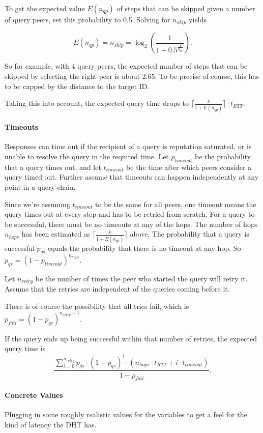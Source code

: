 To get the expected value $E(n_{qp})$ of steps that can be skipped given a
number of query peers, set this probability to 0.5. Solving for $n_{skip}$
yields

\[E(n_{qp}) = n_{skip} = \log_2\left(\frac{1}{1 -
0.5^{\frac{1}{n_{qp}}}}\right).\]

So for example, with 4 query peers, the expected number of steps that can be
skipped by selecting the right peer is about 2.65. To be precise of course, this
has to be capped by the distance to the target ID.

Taking this into account, the expected query time drops to $\lceil\frac{k}{1 +
E(n_{qp})}\rceil \cdot t_{RTT}$.

\paragraph{Timeouts}
Responses can time out if the recipient of a query is reputation saturated, or
is unable to resolve the query in the required time. Let $p_{timeout}$ be the
probability that a query times out, and let $t_{timeout}$ be the time after
which peers consider a query timed out. Further assume that timeouts can happen
independently at any point in a query chain.

Since we're assuming $t_{timeout}$ to be the same for all peers, one timeout
means the query times out at every step and has to be retried from scratch. For
a query to be successful, there must be no timeouts at any of the hops. The
number of hops $n_{hops}$ has been estimated as $\lceil\frac{k}{1 +
E(n_{qp})}\rceil$ above. The probability that a query is successful $p_{qs}$
equals the probability that there is no timeout at any hop. So $p_{qs} = (1 -
p_{timeout})^{n_{hops}}$.

Let $n_{retry}$ be the number of times the peer who started the query will retry
it. Assume that the retries are independent of the queries coming
before it.

There is of course the possibility that all tries fail, which is $p_{fail} = (1
- p_{qs})^{n_{retry} + 1}$.

If the query ends up being successful within that number of retries,
the expected query time is
\[\frac{\sum_{i = 0}^{n_{retry}}p_{qs} \cdot (1 - p_{qs})^i \cdot (n_{hops}
\cdot t_{RTT} + i \cdot t_{timeout})}{1 - p_{fail}}.\]

\paragraph{Concrete Values}
Plugging in some roughly realistic values for the variables to get a feel for
the kind of latency the \ac{DHT} has.

